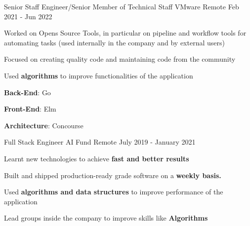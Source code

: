 

\begin{cventries}

    \cventry
    {Senior Staff Engineer/Senior Member of Technical Staff}
    {VMware}
    {Remote}
    {Feb 2021 - Jun 2022}
    {
      \begin{cvitems}
        \item {Worked on Opens Source Tools, in particular on pipeline and workflow tools for automating tasks (used internally in the company and by external users)}
        \item {Focused on creating quality code and maintaining code from the community}
        \item {Used \textbf{algorithms} to improve functionalities of the application}
        \item {\textbf{Back-End}: Go {\dotsep} }
        \item {\textbf{Front-End}: Elm {\dotsep} }
        \item {\textbf{Architecture}: Concourse {\dotsep} }
      \end{cvitems}
      \begin{cvsubentries}
      \end{cvsubentries}
    }
    \cventry
    {Full Stack Engineer}
    {AI Fund}
    {Remote}
    {July 2019 - January 2021}
    {
      \begin{cvitems}
        \item {Learnt new technologies to achieve \textbf{fast and better results}}
        \item {Built and shipped production-ready grade software on a \textbf{weekly basis.}}
        \item {Used \textbf{algorithms and data structures} to improve performance of the application}
        \item {Lead groups inside the company to improve skills like \textbf{Algorithms}}

\end{cvitems}}
\end{cventries}

